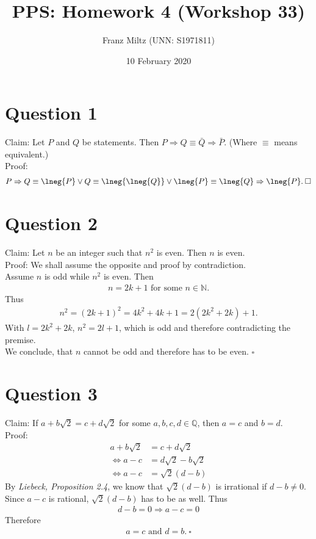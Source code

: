 \documentclass{article}
\title{PPS: Homework 4 (Workshop 33)}
\author{Franz Miltz (UNN: S1971811)}
\date{10 February 2020}
\begin{document}
\maketitle
\section*{Question 1}
Claim: Let $P$ and $Q$ be statements. Then $P\Rightarrow Q\equiv \bar{Q}\Rightarrow \bar{P}$. (Where $\equiv$ means equivalent.)\\
Proof:
\begin{align*}
  P\Rightarrow Q\equiv\lneg{P}\vee Q\equiv \lneg{\lneg{Q}}\vee \lneg{P}\equiv\lneg{Q}\Rightarrow\lneg{P}.\:\square
\end{align*}
\section*{Question 2}
Claim: Let $n$ be an integer such that $n^2$ is even. Then $n$ is even.\\
Proof: We shall assume the opposite and proof by contradiction.\\
Assume $n$ is odd while $n^2$ is even. Then
\begin{align*}
  n=2k+1 \text{ for some } n\in\mathbb{N}.
\end{align*}
Thus
\begin{align*}
  n^2=(2k+1)^2=4k^2+4k+1=2(2k^2+2k)+1.
\end{align*}
With $l=2k^2+2k$, $n^2=2l+1$, which is odd and therefore contradicting the premise.\\
We conclude, that $n$ cannot be odd and therefore has to be even. $\square$
\section*{Question 3}
Claim: If $a+b\sqrt{2}=c+d\sqrt{2}$ for some $a,b,c,d\in\mathbb{Q}$, then $a=c$ and $b=d$.\\
Proof:
\begin{align*}
  a+b\sqrt{2}         & =c+d\sqrt{2}         \\
  \Leftrightarrow a-c & =d\sqrt{2}-b\sqrt{2} \\
  \Leftrightarrow a-c & =\sqrt{2}(d-b)
\end{align*}
By \emph{Liebeck, Proposition 2.4}, we know that $\sqrt{2}(d-b)$ is irrational if $d-b\not=0$. Since $a-c$ is rational, $\sqrt{2}(d-b)$ has to be as well. Thus
\begin{align*}
  d-b=0 \Rightarrow a-c=0
\end{align*}
Therefore
\begin{align*}
  a=c \text{ and } d=b.\:\square
\end{align*}
\end{document}
